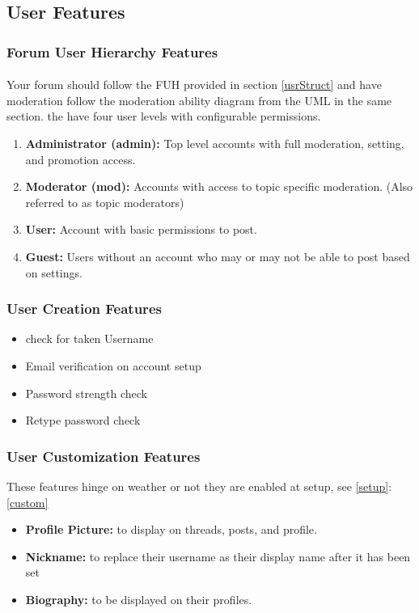 \documentclass[]{article}
\begin{document}
\subsection{User Features}
\subsubsection{Forum User Hierarchy Features}
\paragraph{}
Your forum should follow the FUH provided in section \ref{usrStruct} and have moderation follow the moderation ability diagram from the UML in the same section. the have four user levels with configurable permissions.
\begin{enumerate}
    \item \textbf{Administrator (admin):} Top level accounts with full moderation, setting, and promotion access.
    \item \textbf{Moderator (mod):} Accounts with access to topic specific moderation. (Also referred to as topic moderators)
    \item \textbf{User:} Account with basic permissions to post.
    \item \textbf{Guest:} Users without an account who may or may not be able to post based on settings. 
\end{enumerate}

\subsubsection{User Creation Features}\label{UCF}
\begin{itemize}
    \item check for taken Username
    \item Email verification on account setup
    \item Password strength check
    \item Retype password check 
\end{itemize}

\subsubsection{User Customization Features}
These features hinge on weather or not they are enabled at setup, see \ref{setup}:\ref{custom}
\begin{itemize}
    \item \textbf{Profile Picture:} to display on threads, posts, and profile.
    \item \textbf{Nickname:} to replace their username as their display name after it has been set
    \item \textbf{Biography:} to be displayed on their profiles.
\end{itemize}
\end{document}
